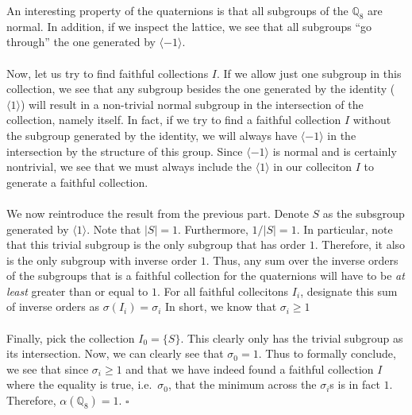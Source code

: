 \documentclass[letterpaper]{article}
\newcommand*{\QED}{\hfill\ensuremath{\square}}%
\begin{document}
An interesting property of the quaternions is that all subgroups of the $ \mathbb{Q}_8 $ are normal.
In addition, if we inspect the lattice, we see that all subgroups ``go through'' the one generated by $ \langle -1 \rangle $.
\\ \\
Now, let us try to find faithful collections $ I $.
If we allow just one subgroup in this collection, we see that any subgroup besides the one generated by the identity ($ \langle 1 \rangle $) will result in a non-trivial normal subgroup in the intersection of the collection, namely itself.
In fact, if we try to find a faithful collection $ I $ without the subgroup generated by the identity, we will always have $ \langle -1 \rangle  $ in the intersection by the structure of this group.
Since $ \langle -1 \rangle $ is normal and is certainly nontrivial, we see that we must always include the $ \langle 1 \rangle $ in our colleciton $ I $ to generate a faithful collection.
\\ \\
We now reintroduce the result from the previous part.
Denote $ S $ as the subsgroup generated by $ \langle 1 \rangle $.
Note that $ |S| = 1 $.
Furthermore, $ 1 / |S| = 1 $.
In particular, note that this trivial subgroup is the only subgroup that has order $ 1 $.
Therefore, it also is the only subgroup with inverse order $ 1 $.
Thus, any sum over the inverse orders of the subgroups that is a faithful collection for the quaternions will have to be \textit{at least} greater than or equal to $ 1 $.
For all faithful collecitons $ I_i $, designate this sum of inverse orders as $ \sigma(I_i) = \sigma_i $
In short, we know that $ \sigma_i \geq 1 $
\\ \\
Finally, pick the collection $ I_0 = \{S\} $.
This clearly only has the trivial subgroup as its intersection.
Now, we can clearly see that $ \sigma_0 = 1 $.
Thus to formally conclude, we see that since $ \sigma_i \geq 1 $ and that we have indeed found a faithful collection $ I $ where the equality is true, i.e.\ $ \sigma_0 $, that the minimum across the $ \sigma_i $s is in fact $ 1 $.
Therefore, $ \alpha\left(\mathbb{Q}_8\right) = 1 $.
\QED{}
\end{document}
